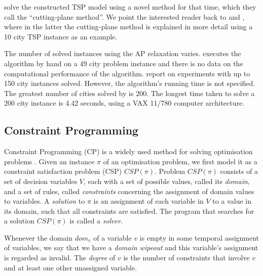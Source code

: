 \documentclass{mprop}
\theoremstyle{definition}
\begin{document}
\citet{Dantzig54} solve the constructed TSP model using a novel method for that time, which they call the ``cutting-plane method''. We point the interested reader back to \citep{Dantzig54} and \citep{Dantzig59}, where in the latter the cutting-plane method is explained in more detail using a 10 city TSP instance as an example.

The number of solved instances using the AP relaxation varies. \citet{Dantzig54} executes the algorithm by hand on a 49 city problem instance and there is no data on the computational performance of the algorithm. \citet{Jonker80} report on experiments with up to 150 city instances solved. However, the algorithm's running time is not specified. The greatest number of cities solved by \citet{Fischetti92} is 200. The longest time taken to solve a 200 city instance is 4.42 seconds, using a VAX 11/780 computer architecture.



\subsection{Constraint Programming}
\label{cp}

Constraint Programming (CP) is a widely used method for solving optimisation problems \citep{Caseau97, Manlove07, Mcdonald02}. Given an instance $\pi$ of an optimisation problem, we first model it as a constraint satisfaction problem (CSP) $CSP(\pi)$. Problem $CSP(\pi)$ consists of a set of decision variables $V$, each with a set of possible values, called its \textit{domain}, and a set of rules, called \textit{constraints} concerning the assignment of domain values to variables. A \textit{solution} to $\pi$ is an assignment of each variable in $V$ to a value in its domain, such that all constraints are satisfied. The program that searches for a solution $CSP(\pi)$ is called a \textit{solver}.

Whenever the domain $dom_{v}$ of a variable $v$ is empty in some temporal assignment of variables, we say that we have a \textit{domain wipeout} and this variable's assignment is regarded as invalid. The \textit{degree} of $v$ is the number of constraints that involve $v$ and at least one other unassigned variable.
\end{document}
